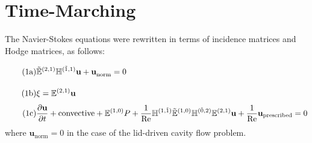\section{Time-Marching}

The Navier-Stokes equations were rewritten in terms of incidence matrices and Hodge matrices, as follows:
\begin{align}
    \stepcounter{equation}
    \tag{{\theequation}a}
    \label{eq:timeContinuity}
    &\tilde{\mathbb{E}}^{(2,1)} \mathbb{H}^{(\tilde{1},1)} \mathbf{u} + \mathbf{u}^{}_{\text{norm}} = 0 \vphantom{\frac{\partial^{(1)}}{\partial}} \\
    \tag{{\theequation}b}
    \label{eq:timeVorticity}
    &\xi = \mathbb{E}^{(2,1)} \mathbf{u} \vphantom{\frac{\partial^{(1)}}{\partial}} \\
    \tag{{\theequation}c}
    \label{eq:timeMomentum}
    &\frac{\partial \mathbf{u}}{\partial t} + \text{convective} + \mathbb{E}^{(1,0)} P + \frac{1}{\text{Re}} \mathbb{H}^{(1,\tilde{1})} \tilde{\mathbb{E}}^{(1,0)} \mathbb{H}^{(\tilde{0},2)} \mathbb{E}^{(2,1)} \mathbf{u} + \frac{1}{\text{Re}} \mathbf{u}_{\text{prescribed}} = 0
\end{align}
where $\mathbf{u}^{}_{\text{norm}} = 0$ in the case of the lid-driven cavity flow problem.

